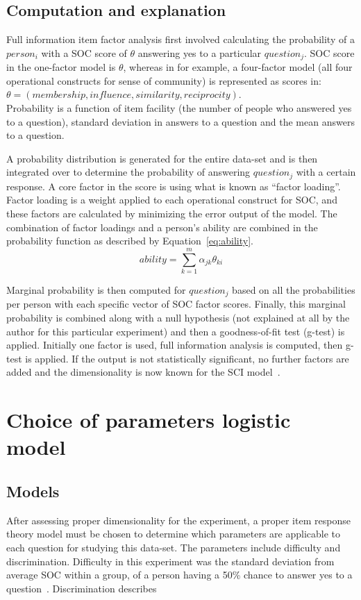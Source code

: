 \documentclass{sig-alternate}
\begin{document}
\subsection{Computation and explanation}
Full information item factor analysis first involved calculating the probability of a $person_i$ with a SOC score of $\theta$ answering yes to a particular $question_j$. SOC score in the one-factor model is $\theta$, whereas in for example, a four-factor model (all four operational constructs for sense of community) is represented as scores in: \\$\theta = (membership, influence, similarity, reciprocity)$.\\ Probability is a function of item facility (the number of people who answered yes to a question), standard deviation in answers to a question and the mean answers to a question. 

A probability distribution is generated for the entire data-set and is then integrated over to determine the probability of answering $question_j$ with a certain response. A core factor in the score is using what is known as ``factor loading''. Factor loading is a weight applied to each operational construct for SOC, and these factors are calculated by minimizing the error output of the model. The combination of factor loadings and a person's ability are combined in the probability function as described by Equation~\ref{eq:ability}.
\begin{equation}
\label{eq:ability}
ability = \sum\limits_{k = 1}^{m} \alpha_{jk} \theta_{ki}
\end{equation}

Marginal probability is then computed for $question_j$ based on all the probabilities per person with each specific vector of SOC factor scores. Finally, this marginal probability is combined along with a null hypothesis (not explained at all by the author for this particular experiment) and then a goodness-of-fit test (g-test) is applied. Initially one factor is used, full information analysis is computed, then g-test is applied. If the output is not statistically significant, no further factors are added and the dimensionality is now known for the SCI model~\cite{analysis:1988}.

\section{Choice of parameters logistic model}
\label{sec:parameterChoice}
\subsection{Models}
After assessing proper dimensionality for the experiment, a proper item response theory model must be chosen to determine which parameters are applicable to each question for studying this data-set. The parameters include difficulty and discrimination. Difficulty in this experiment was the standard deviation from average SOC within a group, of a person having a 50\% chance to answer yes to a question~\cite{disparities:2009}. Discrimination describes 
\end{document}
